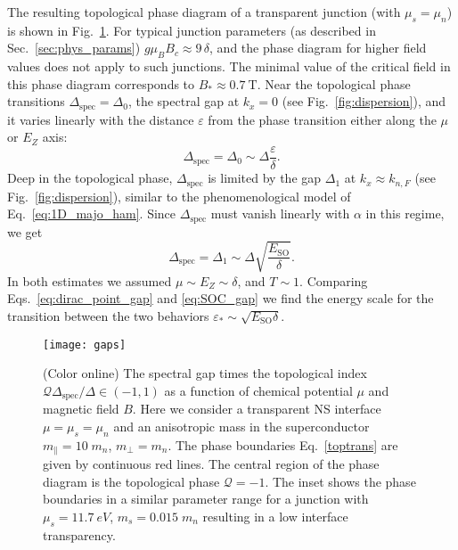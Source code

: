 \documentclass[twocolumn, notitlepage, 10pt, aps, floatfix, showpacs, prb, citeautoscript]{revtex4-1}
\newcommand{\comment}[1]{}
\begin{document}
\comment{It is reasonable overall, and has all the usual asymptotes.}
The resulting topological phase diagram of a transparent junction (with $\mu_s = \mu_n$) is shown in Fig.~\ref{fig:gaps}.
For typical junction parameters (as described in Sec.~\ref{sec:phys_params}) $g\mu_B B_c \approx 9\,\delta$, and the phase diagram for higher field values does not apply to such junctions.
The minimal value of the critical field in this phase diagram corresponds to $B_*\approx \SI{0.7}{\tesla}$.
Near the topological phase transitions $\Delta_\textrm{spec} = \Delta_0$, the spectral gap at $k_x=0$ (see Fig.~\ref{fig:dispersion}), and it varies linearly with the distance $\varepsilon$ from the phase transition either along the $\mu$ or $E_Z$ axis:
\begin{equation}
  \label{eq:dirac_point_gap}
  \Delta_\textrm{spec} = \Delta_0 \sim \Delta \frac{\varepsilon}{\delta}.
\end{equation}
Deep in the topological phase, $\Delta_\textrm{spec}$ is limited by the gap $\Delta_1$ at $k_x \approx k_{n,F}$ (see Fig.~\ref{fig:dispersion}), similar to the phenomenological model of Eq.~\eqref{eq:1D_majo_ham}.
Since $\Delta_\textrm{spec}$ must vanish linearly with $\alpha$ in this regime, we get
\begin{equation}
  \label{eq:SOC_gap}
  \Delta_\textrm{spec} = \Delta_1 \sim \Delta \sqrt{\frac{E_{\textrm{SO}}}{\delta}}.
\end{equation}
In both estimates we assumed $\mu \sim E_Z \sim \delta$, and $T\sim 1$.
Comparing Eqs.~\eqref{eq:dirac_point_gap} and \eqref{eq:SOC_gap} we find the energy scale for the transition between the two behaviors $\varepsilon_* \sim \sqrt{E_\textrm{SO} \delta}$.

\begin{figure}
\texttt{[image: gaps]}
\caption{(Color online) The spectral gap times the topological index $\mathcal Q \Delta_\mathrm{spec} /\Delta \in(-1,1)$ as a function of chemical potential $\mu$ and magnetic field $B$.
Here we consider a transparent NS interface $\mu=\mu_s=\mu_n$ and an anisotropic mass in the superconductor $m_\parallel=10\;m_n$, $m_\perp = m_n$.
The phase boundaries Eq.~\eqref{toptrans} are given by continuous red lines.
The central region of the phase diagram is the topological phase $\mathcal Q=-1$.
The inset shows the phase boundaries in a similar parameter range for a junction with $\mu_s=\SI{11.7}{eV}$, $m_s=0.015\;m_n$ resulting in a low interface transparency.
}
\label{fig:gaps}
\end{figure}
\end{document}

